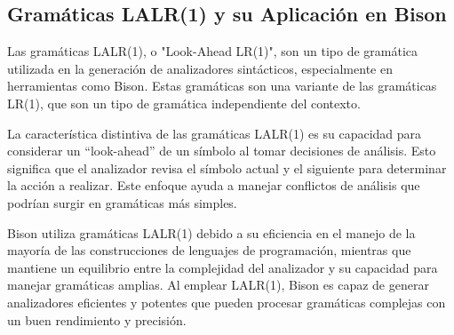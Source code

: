 \subsection{Gramáticas LALR(1) y su Aplicación en Bison}
Las gramáticas LALR(1), o "Look-Ahead LR(1)", son un tipo de gramática utilizada en la generación de analizadores sintácticos, especialmente en herramientas como Bison. Estas gramáticas son una variante de las gramáticas LR(1), que son un tipo de gramática independiente del contexto.

La característica distintiva de las gramáticas LALR(1) es su capacidad para considerar un ``look-ahead'' de un símbolo al tomar decisiones de análisis. Esto significa que el analizador revisa el símbolo actual y el siguiente para determinar la acción a realizar. Este enfoque ayuda a manejar conflictos de análisis que podrían surgir en gramáticas más simples.

Bison utiliza gramáticas LALR(1) debido a su eficiencia en el manejo de la mayoría de las construcciones de lenguajes de programación, mientras que mantiene un equilibrio entre la complejidad del analizador y su capacidad para manejar gramáticas amplias. Al emplear LALR(1), Bison es capaz de generar analizadores eficientes y potentes que pueden procesar gramáticas complejas con un buen rendimiento y precisión.